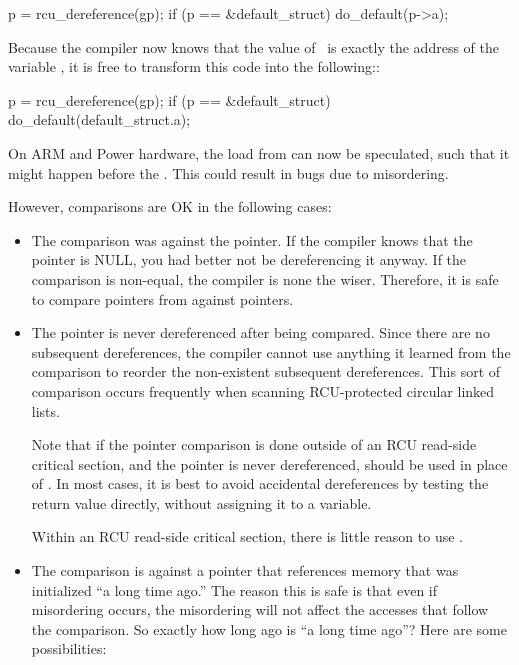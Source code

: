 \begin{itemize}
\begin{VerbatimU}
		p = rcu_dereference(gp);
		if (p == &default_struct)
			do_default(p->a);
\end{VerbatimU}

	Because the compiler now knows that the value of~ is exactly
	the address of the variable , it is free to
	transform this code into the following::

\begin{VerbatimU}
		p = rcu_dereference(gp);
		if (p == &default_struct)
			do_default(default_struct.a);
\end{VerbatimU}

	On ARM and Power hardware, the load from 
	can now be speculated, such that it might happen before the
	.
        This could result in bugs due to misordering.

	However, comparisons are OK in the following cases:

	\begin{itemize}
	\item	The comparison was against the  pointer.
		If the
		compiler knows that the pointer is NULL, you had better
		not be dereferencing it anyway.
		If the comparison is
		non-equal, the compiler is none the wiser.
		Therefore,
		it is safe to compare pointers from 
		against  pointers.

	\item	The pointer is never dereferenced after being compared.
		Since there are no subsequent dereferences, the compiler
		cannot use anything it learned from the comparison
		to reorder the non-existent subsequent dereferences.
		This sort of comparison occurs frequently when scanning
		RCU-protected circular linked lists.

		Note that if the pointer comparison is done outside
		of an RCU read-side critical section, and the pointer
		is never dereferenced,  should be
		used in place of .
		In most cases,
		it is best to avoid accidental dereferences by testing
		the  return value directly, without
		assigning it to a variable.

		Within an RCU read-side critical section, there is little
		reason to use .

	\item	The comparison is against a pointer that references memory
		that was initialized ``a long time ago.''
		The reason
		this is safe is that even if misordering occurs, the
		misordering will not affect the accesses that follow
		the comparison.
		So exactly how long ago is ``a long
		time ago''?
		Here are some possibilities:


\end{itemize}
\end{itemize}
